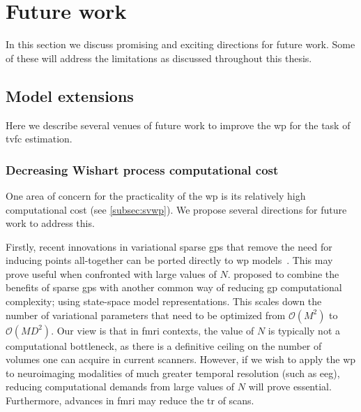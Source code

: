 \clearpage
\section{Future work}

In this section we discuss promising and exciting directions for future work.
Some of these will address the limitations as discussed throughout this thesis.

\subsection{Model extensions}
\label{subsec:model-extensions}

Here we describe several venues of future work to improve the \gls{wp} for the task of \gls{tvfc} estimation.

\subsubsection{Decreasing Wishart process computational cost}
\label{subsubsec:decreasing-wp-computational-cost}

One area of concern for the practicality of the \gls{wp} is its relatively high computational cost (see \cref{subsec:svwp}).
We propose several directions for future work to address this.

Firstly, recent innovations in variational sparse \glspl{gp} that remove the need for inducing points all-together can be ported directly to \gls{wp} models~\parencite[see][]{Saatchi2011, Adam2020, Wilkinson2021}.
This may prove useful when confronted with large values of $N$.
%
\textcite{Adam2020} proposed to combine the benefits of sparse \glspl{gp} with another common way of reducing \gls{gp} computational complexity; using state-space model representations.
This scales down the number of variational parameters that need to be optimized from $\mathcal{O}(M^2)$ to $\mathcal{O}(MD^2)$.
Our view is that in \gls{fmri} contexts, the value of $N$ is typically not a computational bottleneck, as there is a definitive ceiling on the number of volumes one can acquire in current scanners.
However, if we wish to apply the \gls{wp} to neuroimaging modalities of much greater temporal resolution (such as \gls{eeg}), reducing computational demands from large values of $N$ will prove essential.
Furthermore, advances in \gls{fmri} may reduce the \gls{tr} of scans.

